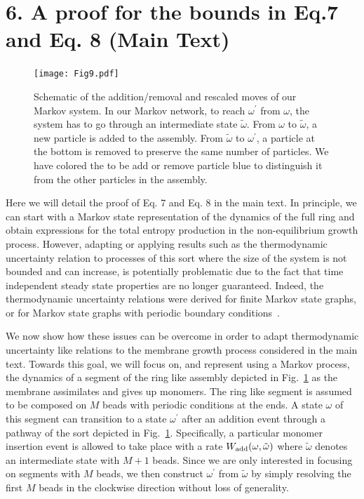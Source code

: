 \documentclass[amsmath,preprintnumbers,10pt,nofootinbib,prl,twocolumn]{revtex4-1}
\begin{document}
\section{6. A proof for the bounds in Eq.7 and Eq. 8 (Main Text) }
\begin{figure}[tbp]
\texttt{[image: Fig9.pdf]}
\caption{ Schematic of the addition/removal and rescaled moves of our Markov system. In our Markov network, to reach $\omega^\prime$ from $\omega$, the system has to go through an intermediate state $\tilde{\omega}$. From $\omega$ to $\tilde{\omega}$, a new particle is added to the assembly. From $\tilde{\omega}$ to $\omega^\prime$, a particle at the bottom is removed to preserve the same number of particles. We have colored the to be add or remove particle blue to distinguish it from the other particles in the assembly.}
\label{fig:MarkovSchematic}
\end{figure}
Here we will detail the proof of Eq. 7 and Eq. 8 in the main text. In principle, we can start with a Markov state representation of the dynamics of the full ring and obtain expressions for the total entropy production in the non-equilibrium growth process. However, adapting or applying results such as the thermodynamic uncertainty relation to processes of this sort where the size of the system is not bounded and can increase, is potentially problematic due to the fact that time independent steady state properties are no longer guaranteed. Indeed, the thermodynamic uncertainty relations were derived for finite Markov state graphs, or for Markov state graphs with periodic boundary conditions~\cite{Barato2015,Gingrich2016}. 

We now show how these issues can be overcome in order to adapt thermodynamic uncertainty like relations to the membrane growth process considered in the main text. Towards this goal, we will focus on, and represent using a Markov process, the dynamics of a segment of the ring like assembly depicted in Fig.~\ref{fig:MarkovSchematic} as the membrane assimilates and gives up monomers. The ring like segment is assumed to be composed on $M$ beads with periodic conditions at the ends. A state $\omega$ of this segment can transition to a state $\omega^{\prime}$ after an addition event through a pathway of the sort depicted in Fig.~\ref{fig:MarkovSchematic}. Specifically, a particular monomer insertion event is allowed to take place with a rate $W_{\rm add}(\omega,\tilde{\omega})$ where $\tilde\omega$ denotes an intermediate state with $M+1$ beads. Since we are only interested in focusing on segments with $M$ beads, we then construct $\omega^\prime$ from $\tilde\omega$ by simply resolving the first $M$ beads in the clockwise direction without loss of generality. 
\end{document}
